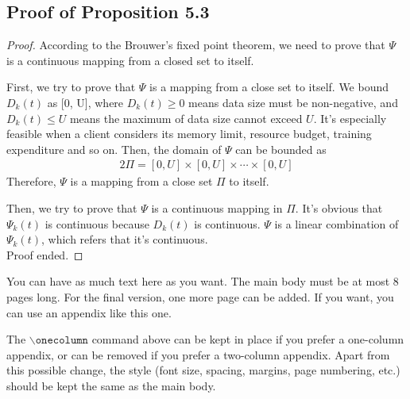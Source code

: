 \documentclass{article}
\theoremstyle{plain}
\theoremstyle{definition}
\theoremstyle{remark}
\begin{document}
\subsection{Proof of Proposition 5.3}
\begin{proof}
    According to the Brouwer's fixed point theorem, we need to prove that $\Psi$ is a continuous mapping from a closed set to itself.
  
    First, we try to prove that $\Psi$ is a mapping from a close set to itself.
    We bound $D_k(t)$ as [0, U], where $D_k(t) \geq 0$ means data size must be non-negative, and $D_k(t) \leq U$ means the maximum of data size cannot exceed $U$.
    It's especially feasible when a client considers its memory limit, resource budget, training expenditure and so on.
    Then, the domain of $\Psi$ can be bounded as
    \begin{alignat}{2}
      \Pi = [0, U] \times [0, U] \times \cdots \times [0, U]
    \end{alignat}
    Therefore, $\Psi$ is a mapping from a close set $\Pi$ to itself.
  
    Then, we try to prove that $\Psi$ is a continuous mapping in $\Pi$.
    It's obvious that $\Psi_k(t)$ is continuous because $D_k(t)$ is continuous.
    $\Psi$ is a linear combination of $\Psi_k(t)$, which refers that it's continuous. \\
    Proof ended.
  \end{proof}


You can have as much text here as you want. The main body must be at most $8$ pages long.
For the final version, one more page can be added.
If you want, you can use an appendix like this one.  

The $\mathtt{\backslash onecolumn}$ command above can be kept in place if you prefer a one-column appendix, or can be removed if you prefer a two-column appendix.  Apart from this possible change, the style (font size, spacing, margins, page numbering, etc.) should be kept the same as the main body.

\end{document}

